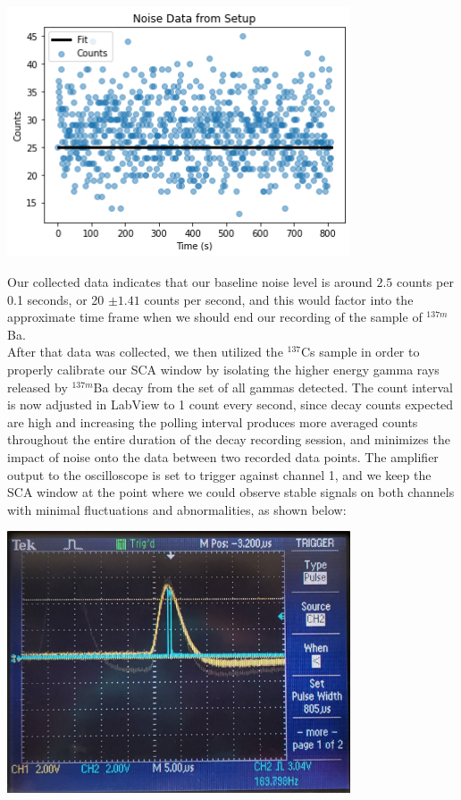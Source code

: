 \documentclass[10pt,letterpaper,onecolumn]{article}
\begin{document}
 \begin{center}
 \includegraphics*[width=4in]{Noise.png}
 \label{fig:noise}
 \end{center}

Our collected data indicates that our baseline noise level is around $ 2.5$ counts per 0.1 seconds, or 20 $\pm 1.41$ counts per second, and this would factor into the approximate time frame when we should end our recording of the sample of $^{137m}$Ba. \\

After that data was collected, we then utilized the $^{137}$Cs sample in order to properly calibrate our SCA window by isolating the higher energy gamma rays released by $^{137m}$Ba decay from the set of all gammas detected. The count interval is now adjusted in LabView to 1 count every second, since decay counts expected are high and increasing the polling interval produces more averaged counts throughout the entire duration of the decay recording session, and minimizes the impact of noise onto the data between two recorded data points. The amplifier output to the oscilloscope is set to trigger against channel 1, and we keep the SCA window at the point where we could observe stable signals on both channels with minimal fluctuations and abnormalities, as shown below:

 \begin{center}
 \includegraphics*[width=4in]{Oscillo.jpg}
 \label{fig:osci}
 \end{center}
\end{document}
